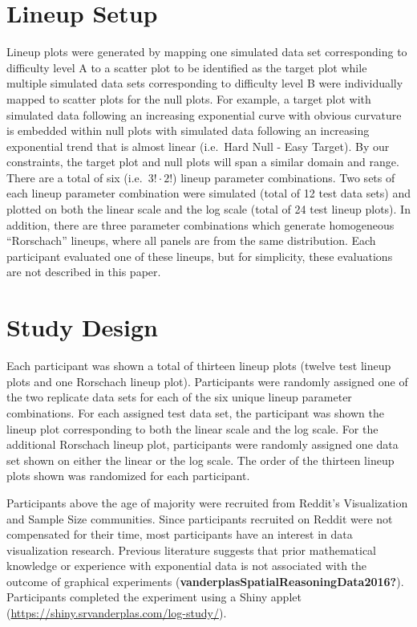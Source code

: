 \documentclass[print]{nuthesis}
\begin{document}
\hypertarget{lineup-setup}{%
\section{Lineup Setup}\label{lineup-setup}}

Lineup plots were generated by mapping one simulated data set corresponding to difficulty level A to a scatter plot to be identified as the target plot while multiple simulated data sets corresponding to difficulty level B were individually mapped to scatter plots for the null plots.
For example, a target plot with simulated data following an increasing exponential curve with obvious curvature is embedded within null plots with simulated data following an increasing exponential trend that is almost linear (i.e.~Hard Null - Easy Target).
By our constraints, the target plot and null plots will span a similar domain and range.
There are a total of six (i.e.~\(3!\cdot 2!\)) lineup parameter combinations.
Two sets of each lineup parameter combination were simulated (total of 12 test data sets) and plotted on both the linear scale and the log scale (total of 24 test lineup plots).
In addition, there are three parameter combinations which generate homogeneous ``Rorschach'' lineups, where all panels are from the same distribution. Each participant evaluated one of these lineups, but for simplicity, these evaluations are not described in this paper.

\hypertarget{study-design}{%
\section{Study Design}\label{study-design}}

Each participant was shown a total of thirteen lineup plots (twelve test lineup plots and one Rorschach lineup plot). Participants were randomly assigned one of the two replicate data sets for each of the six unique lineup parameter combinations. For each assigned test data set, the participant was shown the lineup plot corresponding to both the linear scale and the log scale. For the additional Rorschach lineup plot, participants were randomly assigned one data set shown on either the linear or the log scale. The order of the thirteen lineup plots shown was randomized for each participant.

Participants above the age of majority were recruited from Reddit's Visualization and Sample Size communities.
Since participants recruited on Reddit were not compensated for their time, most participants have an interest in data visualization research.
Previous literature suggests that prior mathematical knowledge or experience with exponential data is not associated with the outcome of graphical experiments (\textbf{vanderplasSpatialReasoningData2016?}).
Participants completed the experiment using a Shiny applet (\url{https://shiny.srvanderplas.com/log-study/}).
\end{document}
